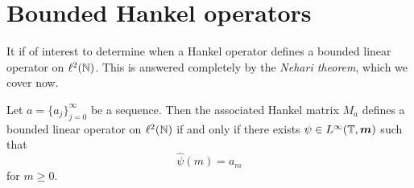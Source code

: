\section{Bounded Hankel operators}
It if of interest to determine when a Hankel operator defines
a bounded linear operator on $\ell^2(\mathbb{N})$. This is answered completely by the
\emph{Nehari theorem}, which we cover now.
\begin{theorem}[Nehari]
\label{nehari}
    Let $a = \{a_j\}_{j=0}^\infty$ be a sequence. Then the 
    associated Hankel matrix $M_a$ defines a bounded linear operator on $\ell^2(\mathbb{N})$
    if and only if there exists $\psi \in L^\infty(\mathbb{T},\boldsymbol{m})$ such that
    \begin{equation}
        \hat{\psi}(m) = a_m
    \end{equation}
    for $m \geq 0$.
\end{theorem}
